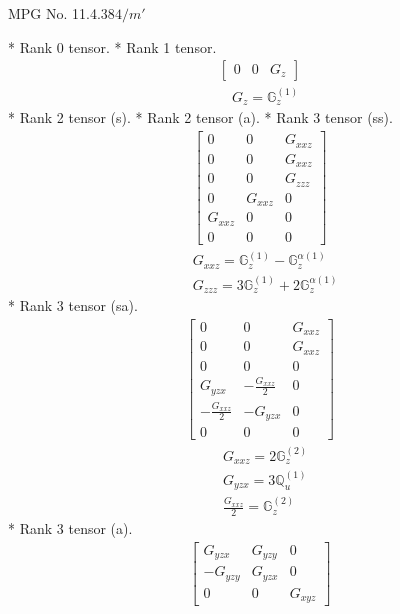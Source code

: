\documentclass[fleqn,8pt,landscape]{jsarticle}
\begin{document}
\setcounter{MaxMatrixCols}{32}

\renewcommand{\tablename}{Table~}
\renewcommand{\figurename}{Figure~}
\begin{center}
\LARGE
MPG No. 11.4.38\quad$4/m'$
\end{center}
* Rank 0 tensor.
* Rank 1 tensor.
\begin{align*}
\begin{bmatrix} 0 & 0 & G_{z} \end{bmatrix}
\end{align*}
\begin{align*}
& G_{z} = \mathbb{G}_{z}^{(1)}
\end{align*}
* Rank 2 tensor (s).
* Rank 2 tensor (a).
* Rank 3 tensor (ss).
\begin{align*}
\begin{bmatrix} 0 & 0 & G_{xxz} \\ 0 & 0 & G_{xxz} \\ 0 & 0 & G_{zzz} \\ 0 & G_{xxz} & 0 \\ G_{xxz} & 0 & 0 \\ 0 & 0 & 0 \end{bmatrix}
\end{align*}
\begin{align*}
& G_{xxz} = \mathbb{G}_{z}^{(1)} - \mathbb{G}_{z}^{\alpha(1)} \\
& G_{zzz} = 3 \mathbb{G}_{z}^{(1)} + 2 \mathbb{G}_{z}^{\alpha(1)}
\end{align*}
* Rank 3 tensor (sa).
\begin{align*}
\begin{bmatrix} 0 & 0 & G_{xxz} \\ 0 & 0 & G_{xxz} \\ 0 & 0 & 0 \\ G_{yzx} & - \frac{G_{xxz}}{2} & 0 \\ - \frac{G_{xxz}}{2} & - G_{yzx} & 0 \\ 0 & 0 & 0 \end{bmatrix}
\end{align*}
\begin{align*}
& G_{xxz} = 2 \mathbb{G}_{z}^{(2)} \\
& G_{yzx} = 3 \mathbb{Q}_{u}^{(1)} \\
& \frac{G_{xxz}}{2} = \mathbb{G}_{z}^{(2)}
\end{align*}
* Rank 3 tensor (a).
\begin{align*}
\begin{bmatrix} G_{yzx} & G_{yzy} & 0 \\ - G_{yzy} & G_{yzx} & 0 \\ 0 & 0 & G_{xyz} \end{bmatrix}
\end{align*}
\end{document}
